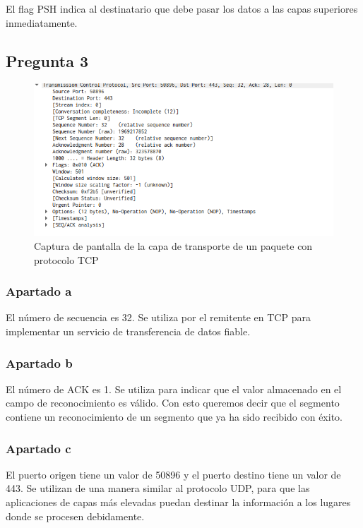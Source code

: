 \documentclass[spanish]{report} %
\begin{document}
El flag PSH indica al destinatario que debe pasar los datos a las capas
superiores inmediatamente.

\subsection{Pregunta 3}

\begin{figure}[h]
\begin{center}
\includegraphics[scale=.5]{../img/5.png}
\end{center}
\caption{Captura de pantalla de la capa de transporte de un paquete con
protocolo TCP}
\end{figure}


\subsubsection{Apartado a}
El número de secuencia es 32. Se utiliza por el remitente en TCP para
implementar un servicio de transferencia de datos fiable.

\subsubsection{Apartado b}
El número de ACK es 1. Se utiliza para indicar que el valor almacenado en el
campo de reconocimiento es válido. Con esto queremos decir que el segmento
contiene un reconocimiento de un segmento que ya ha sido recibido con éxito.

\subsubsection{Apartado c}
El puerto origen tiene un valor de 50896 y el puerto destino tiene un valor de
443. Se utilizan de una manera similar al protocolo UDP, para que las
aplicaciones de capas más elevadas puedan destinar la información a los lugares
donde se procesen debidamente.
\end{document}
